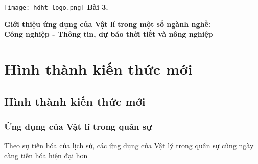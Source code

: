 \newcommand{\chapter}[2][]{
	\newcommand{\chapname}{#2}
	\begin{flushleft}
		\begin{minipage}[t]{\linewidth}
			\texttt{[image: hdht-logo.png]}
			\hspace{0pt}	
			\sffamily\bfseries\large Bài 3.
			\begin{flushleft}
				\Large\bfseries #1
			\end{flushleft}
		\end{minipage}
	\end{flushleft}
	\vspace{1cm}
	\normalfont\normalsize
}
\chapter[Giới thiệu ứng dụng của Vật lí trong một số ngành nghề:\\ Công nghiệp - Thông tin, dự báo thời tiết và nông nghiệp]{Giới thiệu ứng dụng của Vật lí trong một số ngành nghề:\\ Công nghiệp - Thông tin, dự báo thời tiết và nông nghiệp}
\section{Hình thành kiến thức mới}

\subsection{Hình thành kiến thức mới}
\subsubsection{Ứng dụng của Vật lí trong quân sự}
Theo sự tiến hóa của lịch sử, các ứng dụng của Vật lý trong quân sự cũng ngày càng tiến hóa hiện đại hơn

